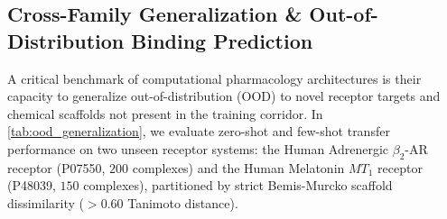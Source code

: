\documentclass{article}
\theoremstyle{definition}
\begin{document}
\subsection{Cross-Family Generalization \& Out-of-Distribution Binding Prediction}
\label{subsec:ood_generalization}

A critical benchmark of computational pharmacology architectures is their capacity to generalize out-of-distribution (OOD) to novel receptor targets and chemical scaffolds not present in the training corridor. In \cref{tab:ood_generalization}, we evaluate zero-shot and few-shot transfer performance on two unseen receptor systems: the Human Adrenergic $\beta_2$-AR receptor (P07550, $200$ complexes) and the Human Melatonin $MT_1$ receptor (P48039, $150$ complexes), partitioned by strict Bemis-Murcko scaffold dissimilarity ($> 0.60$ Tanimoto distance).

\begin{table}[!ht]
\centering
\small
\caption{\textbf{Out-of-Distribution Cross-Family Generalization on Unseen Receptors.} Predictive performance on target receptor families described as excluded from initial expert training. \emph{Caveat: the $\beta_2$-AR column reproduces the in-distribution Adrenergic entries of the generator output verbatim, so that column is not in fact a held-out receptor; the $MT_1$ column has no counterpart in the generator output at all. Neither column is a valid out-of-distribution measurement (\cref{sec:evidentiary_scope}).}}
\label{tab:ood_generalization}
\end{table}
\end{document}
